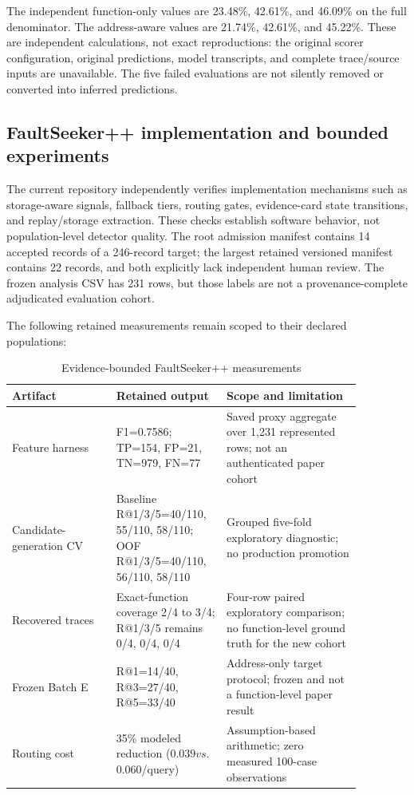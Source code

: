 \documentclass[conference]{IEEEtran}
\begin{document}
The independent function-only values are 23.48\%, 42.61\%, and 46.09\% on
the full denominator. The address-aware values are 21.74\%, 42.61\%, and
45.22\%. These are independent calculations, not exact reproductions: the
original scorer configuration, original predictions, model transcripts, and
complete trace/source inputs are unavailable. The five failed evaluations are
not silently removed or converted into inferred predictions.

\subsection{FaultSeeker++ implementation and bounded experiments}

The current repository independently verifies implementation mechanisms such as
storage-aware signals, fallback tiers, routing gates, evidence-card state
transitions, and replay/storage extraction. These checks establish software
behavior, not population-level detector quality. The root admission manifest
contains 14 accepted records of a 246-record target; the largest retained
versioned manifest contains 22 records, and both explicitly lack independent
human review. The frozen analysis CSV has 231 rows, but those labels are not a
provenance-complete adjudicated evaluation cohort.

The following retained measurements remain scoped to their declared populations:

\begin{table}[t]
\caption{Evidence-bounded FaultSeeker++ measurements}
\label{tab:evidence_bounded}
\centering
\small
\begin{tabular}{p{0.27\linewidth}p{0.25\linewidth}p{0.35\linewidth}}
\toprule
Artifact & Retained output & Scope and limitation\\
\midrule
Feature harness & F1=0.7586; TP=154, FP=21, TN=979, FN=77 & Saved proxy aggregate over 1,231 represented rows; not an authenticated paper cohort\\
Candidate-generation CV & Baseline R@1/3/5=40/110, 55/110, 58/110; OOF R@1/3/5=40/110, 56/110, 58/110 & Grouped five-fold exploratory diagnostic; no production promotion\\
Recovered traces & Exact-function coverage 2/4 to 3/4; R@1/3/5 remains 0/4, 0/4, 0/4 & Four-row paired exploratory comparison; no function-level ground truth for the new cohort\\
Frozen Batch E & R@1=14/40, R@3=27/40, R@5=33/40 & Address-only target protocol; frozen and not a function-level paper result\\
Routing cost & 35\% modeled reduction ($0.039 vs. $0.060/query) & Assumption-based arithmetic; zero measured 100-case observations\\
\bottomrule
\end{tabular}
\end{table}
\end{document}
